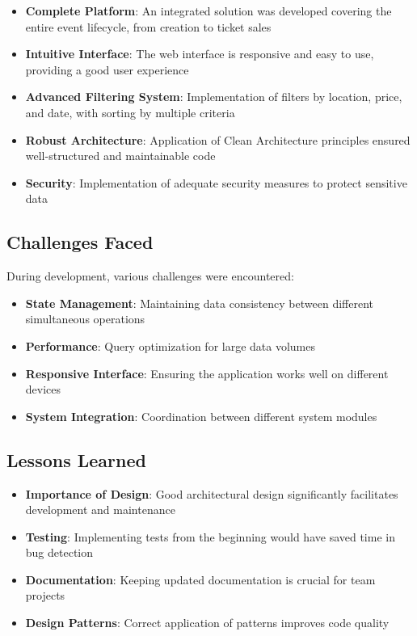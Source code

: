 \documentclass[12pt,a4paper]{article}
\begin{document}
\begin{itemize}
    \item \textbf{Complete Platform}: An integrated solution was developed covering the entire event lifecycle, from creation to ticket sales
    \item \textbf{Intuitive Interface}: The web interface is responsive and easy to use, providing a good user experience
    \item \textbf{Advanced Filtering System}: Implementation of filters by location, price, and date, with sorting by multiple criteria
    \item \textbf{Robust Architecture}: Application of Clean Architecture principles ensured well-structured and maintainable code
    \item \textbf{Security}: Implementation of adequate security measures to protect sensitive data
\end{itemize}

\subsection{Challenges Faced}

During development, various challenges were encountered:

\begin{itemize}
    \item \textbf{State Management}: Maintaining data consistency between different simultaneous operations
    \item \textbf{Performance}: Query optimization for large data volumes
    \item \textbf{Responsive Interface}: Ensuring the application works well on different devices
    \item \textbf{System Integration}: Coordination between different system modules
\end{itemize}

\subsection{Lessons Learned}

\begin{itemize}
    \item \textbf{Importance of Design}: Good architectural design significantly facilitates development and maintenance
    \item \textbf{Testing}: Implementing tests from the beginning would have saved time in bug detection
    \item \textbf{Documentation}: Keeping updated documentation is crucial for team projects
    \item \textbf{Design Patterns}: Correct application of patterns improves code quality
\end{itemize}
\end{document}
